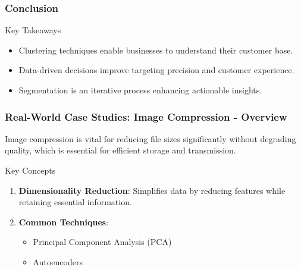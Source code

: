 \documentclass[aspectratio=169]{beamer}
\begin{document}
\begin{frame}[fragile]
    \frametitle{Conclusion}
    \begin{block}{Key Takeaways}
        \begin{itemize}
            \item Clustering techniques enable businesses to understand their customer base.
            \item Data-driven decisions improve targeting precision and customer experience.
            \item Segmentation is an iterative process enhancing actionable insights.
        \end{itemize}
    \end{block}
\end{frame}

\begin{frame}[fragile]
    \frametitle{Real-World Case Studies: Image Compression - Overview}
    Image compression is vital for reducing file sizes significantly without degrading quality, which is essential for efficient storage and transmission.

    \begin{block}{Key Concepts}
        \begin{enumerate}
            \item \textbf{Dimensionality Reduction}: Simplifies data by reducing features while retaining essential information.
            \item \textbf{Common Techniques}:
                \begin{itemize}
                    \item Principal Component Analysis (PCA)
                    \item Autoencoders
                \end{itemize}
        \end{enumerate}
    \end{block}
\end{frame}
\end{document}
